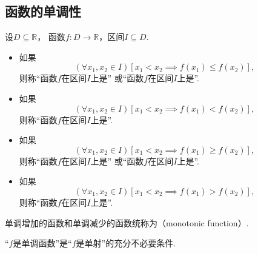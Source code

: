 \subsection{函数的单调性}
\begin{definition}\label{definition:函数的性质.单调性}
设\(D\subseteq\mathbb{R}\)，
函数\(f\colon D\to\mathbb{R}\)，区间\(I \subseteq D\).
\begin{itemize}
	\item 如果\begin{equation*}
		(\forall x_1,x_2\in I)
		[x_1 < x_2 \implies f(x_1) \leq f(x_2)],
	\end{equation*}
	则称“函数\(f\)在区间\(I\)上是”
	或“函数\(f\)在区间\(I\)上是”.

	\item 如果\begin{equation*}
		(\forall x_1,x_2\in I)
		[x_1 < x_2 \implies f(x_1) < f(x_2)],
	\end{equation*}
	则称“函数\(f\)在区间\(I\)上是”.

	\item 如果\begin{equation*}
		(\forall x_1,x_2\in I)
		[x_1 < x_2 \implies f(x_1) \geq f(x_2)],
	\end{equation*}
	则称“函数\(f\)在区间\(I\)上是”
	或“函数\(f\)在区间\(I\)上是”.

	\item 如果\begin{equation*}
		(\forall x_1,x_2\in I)
		[x_1 < x_2 \implies f(x_1) > f(x_2)],
	\end{equation*}
	则称“函数\(f\)在区间\(I\)上是”.
\end{itemize}

单调增加的函数和单调减少的函数统称为（monotonic function）.
\end{definition}

\begin{proposition}
“\(f\)是单调函数”是“\(f\)是单射”的充分不必要条件.
\end{proposition}

